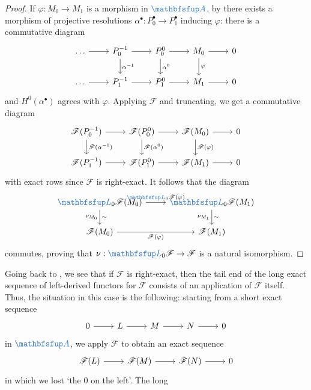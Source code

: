 \begin{proof}
  If $\varphi : M_0 \to M_1$ is a morphism in $\categ{A}$, by
   there exists a morphism of
  projective resolutions
  $\alpha^\bullet : P_0^\bullet \to P_1^\bullet$ inducing $\varphi$:
  there is a commutative diagram
  \[\begin{tikzcd}
      \dots \arrow[r] & P_0^{-1} \arrow[r] \arrow[d, "\alpha^{-1}"] &
      P_0^0 \arrow[r] \arrow[d, "\alpha^0"] & M_0 \arrow[r]
      \arrow[d, "\varphi"] & 0 \\
      \dots \arrow[r] & P_1^{-1} \arrow[r] & P_1^0 \arrow[r] & M_1
      \arrow[r] & 0
    \end{tikzcd}\] and $H^0(\alpha^\bullet)$ agrees with
  $\varphi$. Applying $\mathscr{F}$ and truncating, we get a
  commutative diagram
  \[\begin{tikzcd}
      \mathscr{F}(P_0^{-1}) \arrow[r] \arrow[d,
      "\mathscr{F}(\alpha^{-1})"] & \mathscr{F}(P_0^0) \arrow[r]
      \arrow[d, "\mathscr{F}(\alpha^0)"] &
      \mathscr{F}(M_0) \arrow[r] \arrow[d, "\mathscr{F}(\varphi)"] & 0 \\
      \mathscr{F}(P_1^{-1}) \arrow[r] & \mathscr{F}(P_1^0) \arrow[r] &
      \mathscr{F}(M_1) \arrow[r] & 0
    \end{tikzcd}\] with exact rows since $\mathscr{F}$ is
  right-exact. It follows that the diagram
  \[\begin{tikzcd}
      \categ{L}_0\mathscr{F}(M_0) \arrow[r,
      "\categ{L}_0\mathscr{F}(\varphi)"] \arrow[d, "\nu_{M_0}"',
      "\sim"] & \categ{L}_0\mathscr{F}(M_1)
      \arrow[d, "\sim", "\nu_{M_1}"'] \\
      \mathscr{F}(M_0) \arrow[r, "\mathscr{F}(\varphi)"'] &
      \mathscr{F}(M_1)
    \end{tikzcd}\] commutes, proving that
  $\nu : \categ{L}_0\mathscr{F} \to \mathscr{F}$ is a natural
  isomorphism.
\end{proof}
Going back to , we see that if
$\mathscr{F}$ is right-exact, then the tail end of the long exact
sequence of left-derived functors for $\mathscr{F}$ consists of an
application of $\mathscr{F}$ itself. Thus, the situation in this case
is the following: starting from a short exact sequence
\[\begin{tikzcd}
    0 \arrow[r] & L \arrow[r] & M \arrow[r] & N \arrow[r] & 0
  \end{tikzcd}\] in $\categ{A}$, we apply $\mathscr{F}$ to obtain an
exact sequence
\[\begin{tikzcd}
    \mathscr{F}(L) \arrow[r] & \mathscr{F}(M) \arrow[r] &
    \mathscr{F}(N) \arrow[r] & 0
  \end{tikzcd}\] in which we lost `the $0$ on the left'. The long
